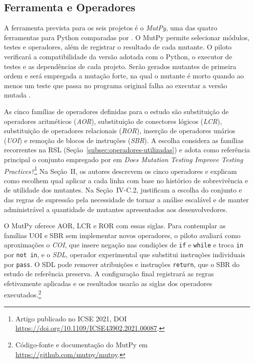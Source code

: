 \subsection{Ferramenta e Operadores}
\label{subsec:ferramenta-operadores}

A ferramenta prevista para os seis projetos é o \textit{MutPy}, uma das quatro ferramentas para Python comparadas por . O MutPy permite selecionar módulos, testes e operadores, além de registrar o resultado de cada mutante. O piloto verificará a compatibilidade da versão adotada com o Python, o executor de testes e as dependências de cada projeto. Serão gerados mutantes de primeira ordem e será empregada a mutação forte, na qual o mutante é morto quando ao menos um teste que passa no programa original falha ao executar a versão mutada \cite{ammann2016}.

As cinco famílias de operadores definidas para o estudo são substituição de operadores aritméticos (\textit{AOR}), substituição de conectores lógicos (\textit{LCR}), substituição de operadores relacionais (\textit{ROR}), inserção de operadores unários (\textit{UOI}) e remoção de blocos de instruções (\textit{SBR}). A escolha considera as famílias recorrentes na RSL (Seção~\ref{subsec:operadores-utilizadas}) e adota como referência principal o conjunto empregado por  em \textit{Does Mutation Testing Improve Testing Practices?}\footnote{Artigo publicado no ICSE 2021, DOI \url{https://doi.org/10.1109/ICSE43902.2021.00087}.} Na Seção~II, os autores descrevem os cinco operadores e explicam como escolhem qual aplicar a cada linha com base no histórico de sobrevivência e de utilidade dos mutantes. Na Seção~IV-C.2, justificam a escolha do conjunto e das regras de supressão pela necessidade de tornar a análise escalável e de manter administrável a quantidade de mutantes apresentados aos desenvolvedores.

O MutPy oferece AOR, LCR e ROR com essas siglas. Para contemplar as famílias UOI e SBR sem implementar novos operadores, o piloto avaliará como aproximações o \textit{COI}, que insere negação nas condições de \texttt{if} e \texttt{while} e troca \texttt{in} por \texttt{not in}, e o \textit{SDL}, operador experimental que substitui instruções individuais por \texttt{pass}. O SDL pode remover atribuições e instruções \texttt{return}, que o SBR do estudo de referência preserva. A configuração final registrará as regras efetivamente aplicadas e os resultados usarão as siglas dos operadores executados.\footnote{Código-fonte e documentação do MutPy em \url{https://github.com/mutpy/mutpy}.}

